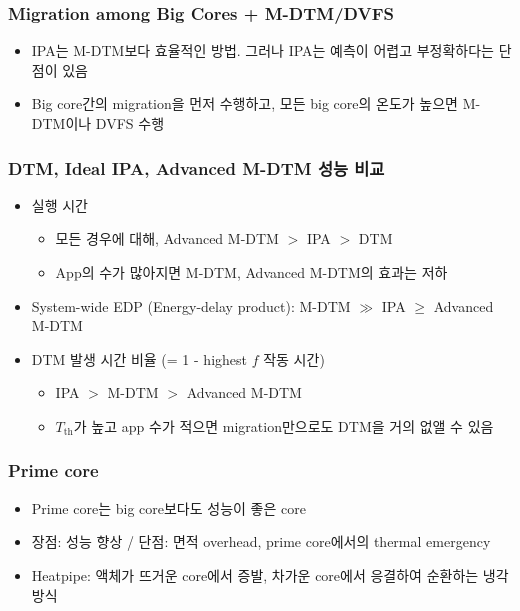 \subsubsection*{Migration among Big Cores + M-DTM/DVFS}
\begin{itemize}
    \item IPA는 M-DTM보다 효율적인 방법. 그러나 IPA는 예측이 어렵고 부정확하다는 단점이 있음
    \item Big core간의 migration을 먼저 수행하고, 모든 big core의 온도가 높으면 M-DTM이나 DVFS 수행
\end{itemize}

\subsubsection*{DTM, Ideal IPA, Advanced M-DTM 성능 비교}
\begin{itemize}
    \item 실행 시간
    \begin{itemize}
        \item 모든 경우에 대해, Advanced M-DTM $>$ IPA $>$ DTM
        \item App의 수가 많아지면 M-DTM, Advanced M-DTM의 효과는 저하
    \end{itemize}
    \item System-wide EDP (Energy-delay product): M-DTM $\gg$ IPA $\geq$ Advanced M-DTM
    \item DTM 발생 시간 비율 (= 1 - highest $f$ 작동 시간)
    \begin{itemize}
        \item IPA $>$ M-DTM $>$ Advanced M-DTM
        \item $T_\mathrm{th}$가 높고 app 수가 적으면 migration만으로도 DTM을 거의 없앨 수 있음
    \end{itemize}
\end{itemize}

\subsubsection*{Prime core}
\begin{itemize}
    \item Prime core는 big core보다도 성능이 좋은 core
    \item 장점: 성능 향상 / 단점: 면적 overhead, prime core에서의 thermal emergency
    \item Heatpipe: 액체가 뜨거운 core에서 증발, 차가운 core에서 응결하여 순환하는 냉각 방식
\end{itemize}
\begin{figures}
\end{figures}

